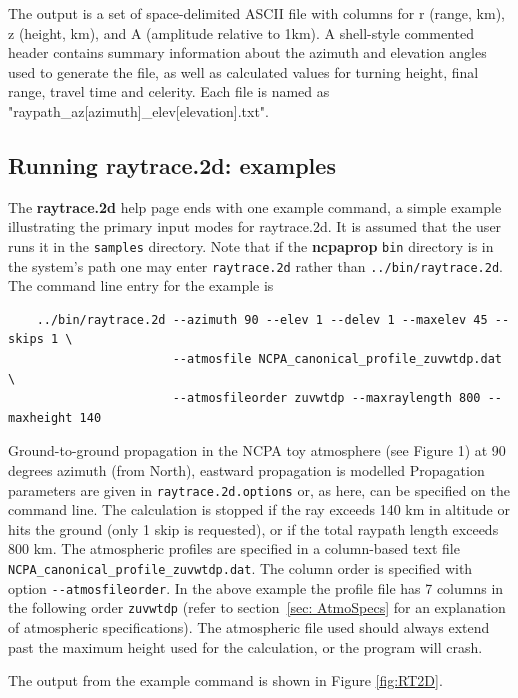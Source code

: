 The output is a set of space-delimited ASCII file with columns for r (range, km), z (height, km), and A (amplitude relative to 1km).  A shell-style commented header contains summary information about the azimuth and elevation angles used to generate the file, as well as calculated values for turning height, final range, travel time and celerity.  Each file is named as "raypath\_az[azimuth]\_elev[elevation].txt".

\subsection{Running raytrace.2d: examples}
\label{sec: raytrace.2d examples}

The \textbf{raytrace.2d} help page ends with one example command, a simple example illustrating the primary input modes for raytrace.2d. It is assumed that the user runs it in the \verb+samples+ directory. Note that if the \textbf{ncpaprop} \verb+bin+ directory is in the system's path one may enter \verb+raytrace.2d+ rather than \verb+../bin/raytrace.2d+. The command line entry for the example is 
\begin{verbatim} 
    ../bin/raytrace.2d --azimuth 90 --elev 1 --delev 1 --maxelev 45 --skips 1 \
                       --atmosfile NCPA_canonical_profile_zuvwtdp.dat \
                       --atmosfileorder zuvwtdp --maxraylength 800 --maxheight 140
\end{verbatim}


Ground-to-ground propagation in the NCPA toy atmosphere (see Figure 1) at 90 degrees azimuth (from North), eastward propagation is modelled Propagation parameters are given in \verb"raytrace.2d.options" or, as here, can be specified on the command line. The calculation is stopped if the ray exceeds 140 km in altitude or hits the ground (only 1 skip is requested), or if the total raypath length exceeds 800 km. The atmospheric profiles are specified in a column-based text file \verb"NCPA_canonical_profile_zuvwtdp.dat". The column order is specified with option \verb"--atmosfileorder". In the above example the profile file has 7 columns in the following order \verb"zuvwtdp" (refer to section~\ref{sec: AtmoSpecs}  for an explanation of atmospheric specifications).  The atmospheric file used should always extend past the maximum height used for the calculation, or the program will crash.

The output from the example command is shown in Figure \ref{fig:RT2D}.\newline 

